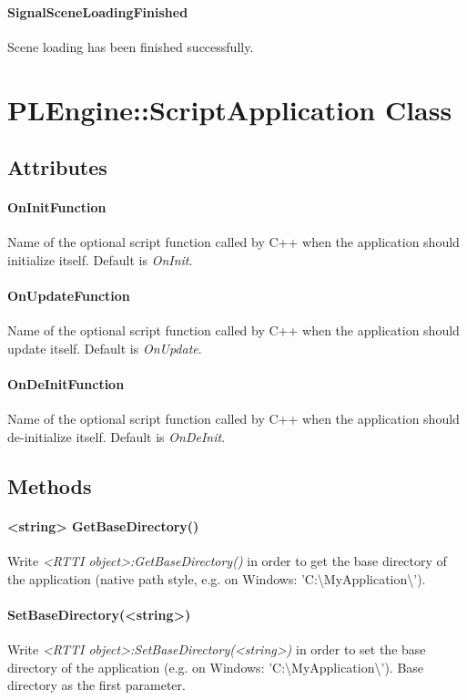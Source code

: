 \paragraph{SignalSceneLoadingFinished}
Scene loading has been finished successfully.




\section{PLEngine::ScriptApplication Class}


\subsection{Attributes}

\paragraph{OnInitFunction}
Name of the optional script function called by C++ when the application should initialize itself. Default is \emph{OnInit}.

\paragraph{OnUpdateFunction}
Name of the optional script function called by C++ when the application should update itself. Default is \emph{OnUpdate}.

\paragraph{OnDeInitFunction}
Name of the optional script function called by C++ when the application should de-initialize itself. Default is \emph{OnDeInit}.


\subsection{Methods}

\paragraph{<string> GetBaseDirectory()}
Write \emph{<RTTI object>:GetBaseDirectory()} in order to get the base directory of the application (native path style, e.g. on Windows: 'C:\textbackslash MyApplication\textbackslash ').

\paragraph{SetBaseDirectory(<string>)}
Write \emph{<RTTI object>:SetBaseDirectory(<string>)} in order to set the base directory of the application (e.g. on Windows: 'C:\textbackslash MyApplication\textbackslash '). Base directory as the first parameter.
